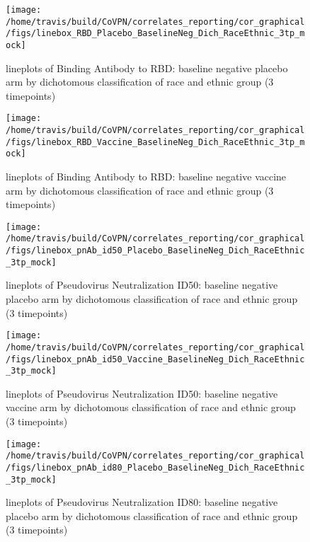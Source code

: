 \documentclass[]{book}
\theoremstyle{definition}
\theoremstyle{definition}
\theoremstyle{definition}
\newcommand{\1}{\mathbbm{1}}
\begin{document}
\clearpage
\begin{figure}[H]

{\centering \texttt{[image: /home/travis/build/CoVPN/correlates\_reporting/cor\_graphical/figs/linebox\_RBD\_Placebo\_BaselineNeg\_Dich\_RaceEthnic\_3tp\_mock]} 

}

\caption{lineplots of Binding Antibody to RBD: baseline negative placebo arm by dichotomous classification of race and ethnic group (3 timepoints)}\label{fig:unnamed-chunk-237}
\end{figure}

\clearpage
\begin{figure}[H]

{\centering \texttt{[image: /home/travis/build/CoVPN/correlates\_reporting/cor\_graphical/figs/linebox\_RBD\_Vaccine\_BaselineNeg\_Dich\_RaceEthnic\_3tp\_mock]} 

}

\caption{lineplots of Binding Antibody to RBD: baseline negative vaccine arm by dichotomous classification of race and ethnic group (3 timepoints)}\label{fig:unnamed-chunk-238}
\end{figure}

\clearpage
\begin{figure}[H]

{\centering \texttt{[image: /home/travis/build/CoVPN/correlates\_reporting/cor\_graphical/figs/linebox\_pnAb\_id50\_Placebo\_BaselineNeg\_Dich\_RaceEthnic\_3tp\_mock]} 

}

\caption{lineplots of Pseudovirus Neutralization ID50: baseline negative placebo arm by dichotomous classification of race and ethnic group (3 timepoints)}\label{fig:unnamed-chunk-239}
\end{figure}

\clearpage
\begin{figure}[H]

{\centering \texttt{[image: /home/travis/build/CoVPN/correlates\_reporting/cor\_graphical/figs/linebox\_pnAb\_id50\_Vaccine\_BaselineNeg\_Dich\_RaceEthnic\_3tp\_mock]} 

}

\caption{lineplots of Pseudovirus Neutralization ID50: baseline negative vaccine arm by dichotomous classification of race and ethnic group (3 timepoints)}\label{fig:unnamed-chunk-240}
\end{figure}

\clearpage
\begin{figure}[H]

{\centering \texttt{[image: /home/travis/build/CoVPN/correlates\_reporting/cor\_graphical/figs/linebox\_pnAb\_id80\_Placebo\_BaselineNeg\_Dich\_RaceEthnic\_3tp\_mock]} 

}

\caption{lineplots of Pseudovirus Neutralization ID80: baseline negative placebo arm by dichotomous classification of race and ethnic group (3 timepoints)}\label{fig:unnamed-chunk-241}
\end{figure}
\end{document}
